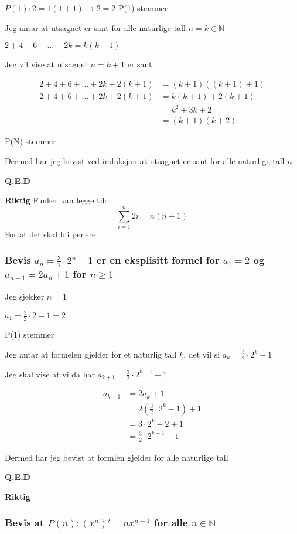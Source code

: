 \documentclass{article}
\begin{document}
$P(1): 2=1(1+1) \rightarrow 2=2$ P(1) stemmer 

Jeg antar at utsagnet er sant for alle naturlige tall $n=k \in \mathbb{N}$

$2+4+6+...+2k=k(k+1)$

Jeg vil vise at utsagnet $n = k + 1$ er sant:

\begin{align*}
    2+4+6+...+2k+2(k+1) &= (k+1)((k+1) + 1) \\
    2+4+6+...+2k+2(k+1) &= k(k+1)+2(k+1) \\
    &= k^2+3k+2 \\
    &= (k+1)(k+2)
\end{align*}

P(N) stemmer

Dermed har jeg bevist ved induksjon at utsagnet er sant for alle naturlige tall $n$

\textbf{Q.E.D}

\textbf{Riktig}
Funker kan legge til:
\[
\sum_{i=1}^{n} 2i = n(n + 1)
\]
For at det skal bli penere

\subsubsection{Bevis $a_n=\frac{3}{2} \cdot 2^n -1$ er en eksplisitt formel for $a_1=2$ og $a_{n+1}=2a_n+1$ for $n \ge 1$}

Jeg sjekker $n=1$

$a_1=\frac{3}{2} \cdot 2 - 1 = 2$

P(1) stemmer

Jeg antar at formelen gjelder for et naturlig tall $k$, det vil si  $a_k=\frac{3}{2} \cdot 2^k - 1$

Jeg skal vise at vi da har $a_{k+1} = \frac{3}{2} \cdot 2^{k+1} - 1$

\begin{align*}
    a_{k+1} &= 2a_k+1 \\
    &= 2(\frac{3}{2} \cdot 2^{k} - 1) + 1 \\
    &= 3 \cdot 2^k - 2 + 1 \\
    &= \frac{3}{2} \cdot 2^{k+1} - 1
\end{align*}

Dermed har jeg bevist at formlen gjelder for alle naturlige tall

\textbf{Q.E.D}

\textbf{Riktig}

\subsubsection{Bevis at $P(n): (x^n)'= nx^{n-1}$ for alle $n \in \mathbb{N}$}
\end{document}
